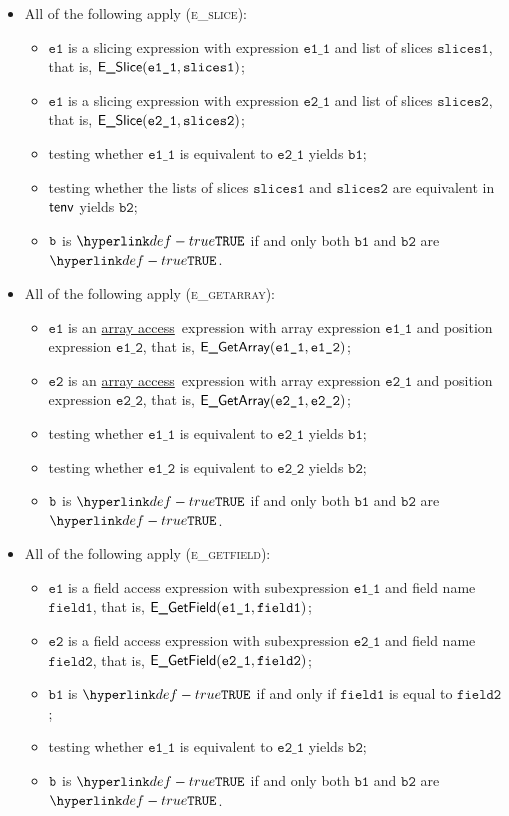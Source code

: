 \documentclass{book}
\newcommand\ProseOrTypeError[0]{\ProseTerminateAs{\TypeErrorConfig}}
\newcommand\arrayaccess[0]{\hyperlink{def-arrayaccess}{array access}}
\newcommand\veone[0]{\texttt{e1}}
\newcommand\vetwo[0]{\texttt{e2}}
\newcommand\vfieldone[0]{\texttt{field1}}
\newcommand\vfieldtwo[0]{\texttt{field2}}
\newcommand\veoneone[0]{\texttt{e1\_1}}
\newcommand\veonetwo[0]{\texttt{e1\_2}}
\newcommand\vetwoone[0]{\texttt{e2\_1}}
\newcommand\vetwotwo[0]{\texttt{e2\_2}}
\newcommand\vbone[0]{\texttt{b1}}
\newcommand\vbtwo[0]{\texttt{b2}}
\newcommand\slicesone[0]{\texttt{slices1}}
\newcommand\slicestwo[0]{\texttt{slices2}}
\begin{document}
\begin{itemize}
  \item All of the following apply (\textsc{e\_slice}):
  \begin{itemize}
    \item $\veone$ is a slicing expression with expression $\veoneone$ and list of slices $\slicesone$,
          that is, $\ESlice(\veoneone, \slicesone)$;
    \item $\veone$ is a slicing expression with expression $\vetwoone$ and list of slices $\slicestwo$,
          that is, $\ESlice(\vetwoone, \slicestwo)$;
    \item testing whether $\veoneone$ is equivalent to $\vetwoone$ yields $\vbone$\ProseOrTypeError;
    \item testing whether the lists of slices $\slicesone$ and $\slicestwo$ are equivalent in $\textsf{tenv}$ yields $\vbtwo$\ProseOrTypeError;
    \item $\texttt{b}$ is $\True$ if and only both $\vbone$ and $\vbtwo$ are $\True$.
  \end{itemize}

  \item All of the following apply (\textsc{e\_getarray}):
  \begin{itemize}
    \item $\veone$ is an \arrayaccess\ expression with array expression $\veoneone$ and position expression $\veonetwo$,
          that is, $\EGetArray(\veoneone, \veonetwo)$;
    \item $\vetwo$ is an \arrayaccess\ expression with array expression $\vetwoone$ and position expression $\vetwotwo$,
          that is, $\EGetArray(\vetwoone, \vetwotwo)$;
    \item testing whether $\veoneone$ is equivalent to $\vetwoone$ yields $\vbone$\ProseOrTypeError;
    \item testing whether $\veonetwo$ is equivalent to $\vetwotwo$ yields $\vbtwo$\ProseOrTypeError;
    \item $\texttt{b}$ is $\True$ if and only both $\vbone$ and $\vbtwo$ are $\True$.
  \end{itemize}

  \item All of the following apply (\textsc{e\_getfield}):
  \begin{itemize}
    \item $\veone$ is a field access expression with subexpression $\veoneone$ and field name $\vfieldone$,
          that is, $\EGetField(\veoneone, \vfieldone)$;
    \item $\vetwo$ is a field access expression with subexpression $\vetwoone$ and field name $\vfieldtwo$,
          that is, $\EGetField(\vetwoone, \vfieldtwo)$;
    \item $\vbone$ is $\True$ if and only if $\vfieldone$ is equal to $\vfieldtwo$;
    \item testing whether $\veoneone$ is equivalent to $\vetwoone$ yields $\vbtwo$\ProseOrTypeError;
    \item $\texttt{b}$ is $\True$ if and only both $\vbone$ and $\vbtwo$ are $\True$.
  \end{itemize}


\end{itemize}
\end{document}
